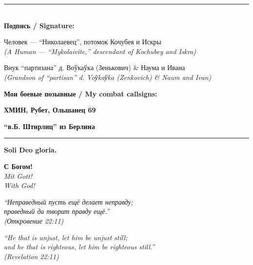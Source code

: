 \documentclass[11pt,a4paper]{article}
\theoremstyle{definition}
\theoremstyle{remark}
\begin{document}
\begin{center}

\vspace{1cm}

\rule{0.6\textwidth}{0.4pt} \\[0.5cm]

\textbf{Подпись / Signature:}

\vspace{0.3cm}

Человек — ``Николаевец'', потомок Кочубея и Искры \\
\textit{(A Human — ``Mykolaivite,'' descendant of Kochubey and Iskra)}

\vspace{0.3cm}

Внук ``партизана'' д. Воўкаўка (Зенькович) \& Наума и Ивана \\
\textit{(Grandson of ``partisan'' d. Voўkaўka (Zenkovich) \& Naum and Ivan)}

\vspace{0.5cm}

\textbf{Мои боевые позывные / My combat callsigns:}

\textbf{ХМИН, Рубет, Ольшанец 69}

\vspace{0.3cm}

\textbf{``в.Б. Штирлиц'' из Берлина}

\vspace{0.5cm}

\rule{0.6\textwidth}{0.4pt}

\vspace{1cm}

\Large
\textbf{Soli Deo gloria.}

\vspace{0.3cm}

\foreignlanguage{russian}{\textbf{С Богом!}} \\
\textit{Mit Gott!} \\
\textit{With God!}

\vspace{1cm}

\normalsize
\foreignlanguage{russian}{
\textit{``Неправедный пусть ещё делает неправду;\\
праведный да творит правду ещё.''\\
(Откровение 22:11)}
}

\vspace{0.5cm}

\textit{``He that is unjust, let him be unjust still;\\
and he that is righteous, let him be righteous still.''\\
(Revelation 22:11)}


\end{center}
\end{document}
